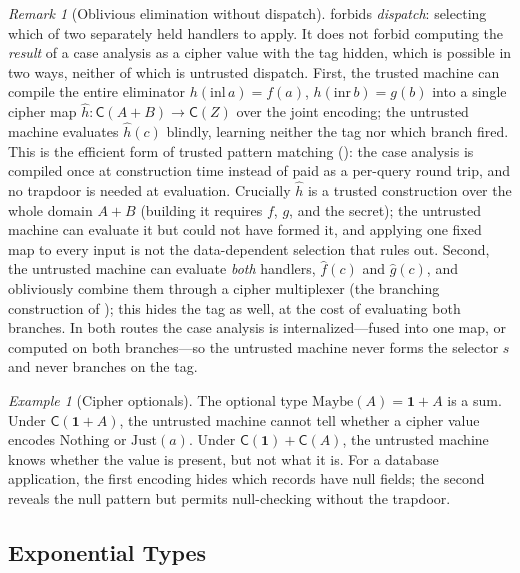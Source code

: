 \documentclass[11pt]{article}
\theoremstyle{definition}
\theoremstyle{plain}
\theoremstyle{remark}
\newtheorem{remark}{Remark}[section]
\newtheorem{example}{Example}[section]
\newcommand{\fhat}{\hat{f}}
\newcommand{\cipher}[1]{\mathsf{C}(#1)}
\begin{document}
\begin{remark}[Oblivious elimination without dispatch]
\label{rem:oblivious-elim}
 forbids \emph{dispatch}: selecting which of
two separately held handlers to apply.
It does not forbid computing the \emph{result} of a case analysis as a
cipher value with the tag hidden, which is possible in two ways, neither
of which is untrusted dispatch.
First, the trusted machine can compile the entire eliminator
$h(\mathrm{inl}\,a) = f(a)$, $h(\mathrm{inr}\,b) = g(b)$ into a single
cipher map $\hat{h} : \cipher{A+B} \to \cipher{Z}$ over the joint
encoding; the untrusted machine evaluates $\hat{h}(c)$ blindly, learning
neither the tag nor which branch fired.
This is the efficient form of trusted pattern matching
(): the case analysis is compiled once at
construction time instead of paid as a per-query round trip, and no
trapdoor is needed at evaluation.
Crucially $\hat{h}$ is a trusted construction over the whole domain
$A+B$ (building it requires $f$, $g$, and the secret); the untrusted
machine can evaluate it but could not have formed it, and applying one
fixed map to every input is not the data-dependent selection that
 rules out.
Second, the untrusted machine can evaluate \emph{both} handlers,
$\fhat(c)$ and $\hat{g}(c)$, and obliviously combine them through a
cipher multiplexer (the branching construction of
); this hides the tag as well, at the cost of
evaluating both branches.
In both routes the case analysis is internalized---fused into one map,
or computed on both branches---so the untrusted machine never forms the
selector $s$ and never branches on the tag.
\end{remark}

\begin{example}[Cipher optionals]
\label{ex:optional}
The optional type $\mathrm{Maybe}(A) = \mathbf{1} + A$ is a sum.
Under $\cipher{\mathbf{1} + A}$, the untrusted machine cannot tell
whether a cipher value encodes $\mathrm{Nothing}$ or $\mathrm{Just}(a)$.
Under $\cipher{\mathbf{1}} + \cipher{A}$, the untrusted machine knows
whether the value is present, but not what it is.
For a database application, the first encoding hides which records have null
fields; the second reveals the null pattern but permits null-checking without
the trapdoor.
\end{example}


\subsection{Exponential Types}
\label{sec:exponentials}
\end{document}
